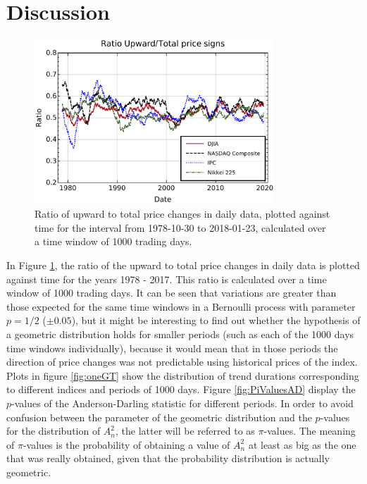 \documentclass[a4paper]{jpconf}
\begin{document}
\section{Discussion}
\label{discussion}

\begin{figure}
\begin{center}
\includegraphics[width=9cm]{img/sign_ratios}
\end{center}
\caption{\label{fig:simetria}Ratio of upward to total price changes in daily data, plotted against time for the interval from 1978-10-30 to 2018-01-23, calculated over a time window of 1000 trading days.}
\end{figure}

In Figure \ref{fig:simetria}, the ratio of the upward to total price changes in daily data is plotted against time for the years 1978 - 2017. This ratio is calculated over a time window of 1000 trading days. It can be seen that variations are greater than those expected for the same time windows in a Bernoulli process with parameter $p = 1/2$ ($\pm{0.05}$), but it might be interesting to find out whether the hypothesis of a geometric distribution holds for smaller periods (such as each of the 1000 days time windows individually), because it would mean that in those periods the direction of price changes was not predictable using historical prices of the index. Plots in figure \ref{fig:oneGT} show the distribution of trend durations corresponding to different indices and periods of 1000 days. Figure \ref{fig:PiValuesAD} display the $p$-values of the Anderson-Darling statistic for different periods. In order to avoid confusion between the parameter of the geometric distribution and the $p$-values for the distribution of $A^{2}_{n}$, the latter will be referred to as $\pi$-values. The meaning of $\pi$-values is the probability of obtaining a value of $A^{2}_{n}$ at least as big as the one that was really obtained, given that the probability distribution is actually geometric.
\end{document}
